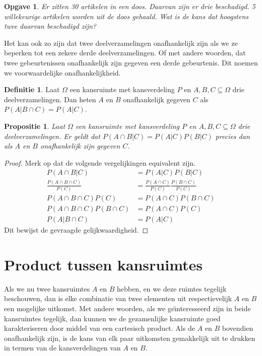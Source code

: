 \documentclass[a4paper]{book}
\newtheorem{proposition}[theorem]{Propositie}
\newtheorem{exercise}[theorem]{Opgave}
\theoremstyle{definition}
\newtheorem{definition}[theorem]{Definitie}
\begin{document}
\begin{exercise}
Er zitten 30 artikelen in een doos. Daarvan zijn er drie beschadigd.
5 willekeurige artikelen worden uit de doos gehaald. Wat is de kans dat hoogstens twee daarvan beschadigd zijn?
\end{exercise}

Het kan ook zo zijn dat twee deelverzamelingen onafhankelijk zijn als we ze beperken tot een zekere derde deelverzamelingen.
Of met andere woorden, dat twee gebeurtenissen onafhankelijk zijn gegeven een derde gebeurtenis.
Dit noemen we voorwaardelijke onafhankelijkheid.
\begin{definition}
    Laat $\Omega$ een kansruimte met kansverdeling $P$ en $A,B,C \subseteq \Omega$ drie deelverzamelingen.
    Dan heten $A$ en $B$ onafhankelijk gegeven $C$ als $P(A|B \cap C) = P(A|C)$.
\end{definition}

\begin{proposition}
    Laat $\Omega$ een kansruimte met kansverdeling $P$ en $A,B,C \subseteq \Omega$ drie deelverzamelingen.
    Er geldt dat $P(A \cap B|C) = P(A|C)P(B|C)$ precies dan als $A$ en $B$ onafhankelijk zijn gegeven $C$.
\end{proposition}
\begin{proof}
    Merk op dat de volgende vergelijkingen equivalent zijn.
    \begin{align*}
        P(A \cap B|C)                       &= P(A|C)P(B|C) \\
        \frac{P(A \cap B \cap C)}{P(C)}     &= \frac{P(A \cap C)}{P(C)} \frac{P(B \cap C)}{P(C)} \\
        P(A \cap B \cap C)P(C)              &= P(A \cap C)P(B \cap C) \\
        P(A \cap B \cap C)P(B \cap C)       &= P(A \cap C)P(C) \\
        P(A | B \cap C)                     &= P(A | C)
    \end{align*}
    Dit bewijst de gevraagde gelijkwaardigheid.
\end{proof}


\section{Product tussen kansruimtes}
Als we nu twee kansruimtes $A$ en $B$ hebben, en we deze ruimtes tegelijk beschouwen, dan is elke
combinatie van twee elementen uit respectievelijk $A$ en $B$ een mogelijke uitkomst.
Met andere woorden, als we ge\"{\i}nteresseerd zijn in beide kansruimtes tegelijk, dan kunnen we de gezamenlijke kansruimte goed karakteriseren
door middel van een cartesisch product.
Als de $A$ en $B$ bovendien onafhankelijk zijn, is de kans van elk paar uitkomsten gemakkelijk uit te drukken in termen van de kansverdelingen van $A$
en $B$.
\end{document}
